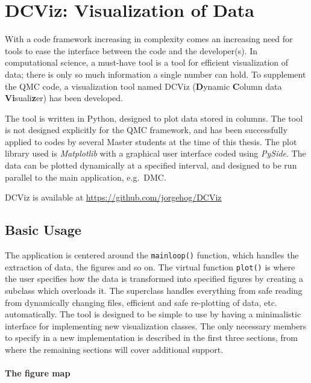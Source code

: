 \chapter{DCViz: Visualization of Data}
\label{appendix:DCVIZ}

With a code framework increasing in complexity comes an increasing need for tools to ease the interface between the code and the developer(s). In computational science, a must-have tool is a tool for efficient visualization of data; there is only so much information a single number can hold. To supplement the QMC code, a visualization tool named DCViz (\textbf{D}ynamic \textbf{C}olumn data \textbf{Vi}suali\textbf{z}er) has been developed.

The tool is written in Python, designed to plot data stored in columns. The tool is not designed explicitly for the QMC framework, and has been successfully applied to codes by several Master students at the time of this thesis. The plot library used is \textit{Matplotlib}\cite{Matplotlib} with a graphical user interface coded using \textit{PySide}\cite{Pyside}. The data can be plotted dynamically at a specified interval, and designed to be run parallel to the main application, e.g.~DMC.

DCViz is available at \url{https://github.com/jorgehog/DCViz}

\section{Basic Usage}

The application is centered around the \verb+mainloop()+ function, which handles the extraction of data, the figures and so on. The virtual function \verb+plot()+ is where the user specifies how the data is transformed into specified figures by creating a subclass which overloads it. The superclass handles everything from safe reading from dynamically changing files, efficient and safe re-plotting of data, etc. automatically. The tool is designed to be simple to use by having a minimalistic interface for implementing new visualization classes. The only necessary members to specify in a new implementation is described in the first three sections, from where the remaining sections will cover additional support. 

\subsubsection{The figure map}

